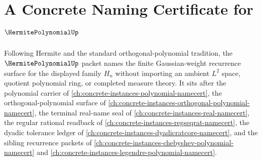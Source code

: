 \chapter{A Concrete Naming Certificate for $\HermitePolynomialUp$}
\label{ch:concrete-instances-hermite-polynomial-namecert}

Following Hermite and the standard orthogonal-polynomial tradition, the $\HermitePolynomialUp$ packet names the finite Gaussian-weight recurrence surface for the displayed family $H_n$ without importing an ambient $L^2$ space, quotient polynomial ring, or completed measure theory. It sits after the polynomial carrier of \autoref{ch:concrete-instances-polynomial-namecert}, the orthogonal-polynomial surface of \autoref{ch:concrete-instances-orthogonal-polynomial-namecert}, the terminal real-name seal of \autoref{ch:concrete-instances-real-namecert}, the regular rational readback of \autoref{ch:concrete-instances-regseqrat-namecert}, the dyadic tolerance ledger of \autoref{ch:concrete-instances-dyadicratcore-namecert}, and the sibling recurrence packets of \autoref{ch:concrete-instances-chebyshev-polynomial-namecert} and \autoref{ch:concrete-instances-legendre-polynomial-namecert}.


